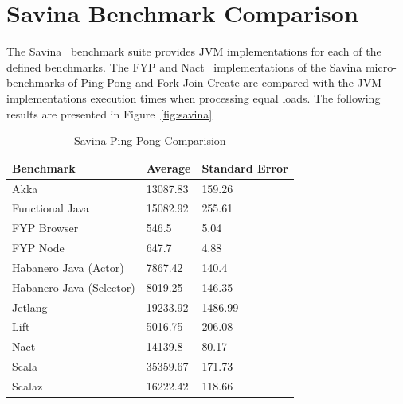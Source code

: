 \documentclass[oneside]{um-fict}
\begin{document}
\section{Savina Benchmark Comparison}
The Savina~\cite{savina} benchmark suite provides JVM implementations for each of the defined benchmarks. The FYP and Nact~\cite{nact} implementations of the Savina micro-benchmarks of Ping Pong and Fork Join Create are compared with the JVM implementations execution times when processing equal loads. The following results are presented in Figure~\ref{fig:savina}
\begin{table}[H]
    \begin{center}
        \begin{tabular}{|l|ll|}
        \hline
        Benchmark                & Average  & Standard Error \\ \hline
        Akka                     & 13087.83 & 159.26         \\
        Functional Java          & 15082.92 & 255.61         \\
        FYP Browser              & 546.5    & 5.04           \\
        FYP Node                 & 647.7    & 4.88           \\
        Habanero Java (Actor)    & 7867.42  & 140.4          \\
        Habanero Java (Selector) & 8019.25  & 146.35         \\
        Jetlang                  & 19233.92 & 1486.99        \\
        Lift                     & 5016.75  & 206.08         \\
        Nact                     & 14139.8  & 80.17          \\
        Scala                    & 35359.67 & 171.73         \\
        Scalaz                   & 16222.42 & 118.66         \\ \hline
        \end{tabular}
        \caption{Savina Ping Pong Comparision}\label{tab:savinapingpong}
    \end{center}
\end{table}
\end{document}

